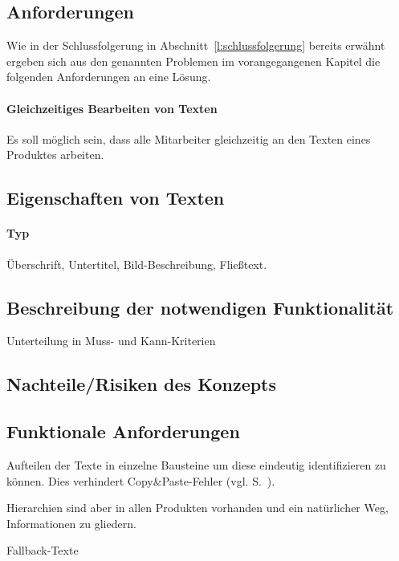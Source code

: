 \subsection{Anforderungen}\label{l:anforderungen}

Wie in der Schlussfolgerung in Abschnitt~\ref{l:schlussfolgerung} bereits erwähnt ergeben sich aus den genannten Problemen im vorangegangenen Kapitel die folgenden Anforderungen an eine Lösung.

\paragraph{Gleichzeitiges Bearbeiten von Texten} Es soll möglich sein, dass alle  Mitarbeiter gleichzeitig an den Texten eines Produktes arbeiten.



\subsection{Eigenschaften von Texten}
\label{l:textattribute}

\paragraph{Typ} Überschrift, Untertitel, Bild-Beschreibung, Fließtext.

\subsection{Beschreibung der notwendigen Funktionalität}

Unterteilung in Muss- und Kann-Kriterien

\subsection{Nachteile/Risiken des Konzepts}

\subsection{Funktionale Anforderungen}

\label{l:anforderungen}

\TODO

Aufteilen der Texte in einzelne Bausteine um diese eindeutig identifizieren zu können. Dies verhindert Copy\&Paste-Fehler (vgl. S.~\pageref{p:serielles-konzept}).

\label{l:hierarchien} Hierarchien sind aber in allen Produkten vorhanden und ein natürlicher Weg, Informationen zu gliedern. 

Fallback-Texte